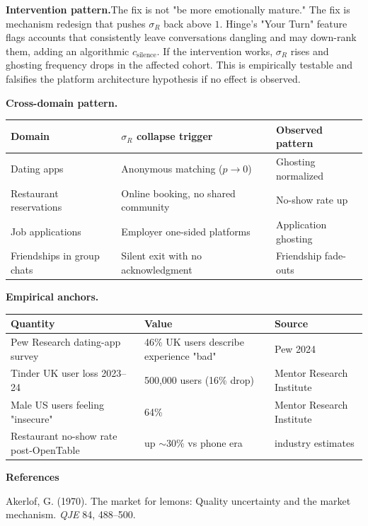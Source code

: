 \documentclass[12pt]{article}
\begin{document}
\bigskip

\medskip\noindent\textbf{Intervention pattern.}\quad The fix is not "be more emotionally mature." The fix is mechanism redesign that pushes $\sigma_R$ back above $1$. Hinge's "Your Turn" feature flags accounts that consistently leave conversations dangling and may down-rank them, adding an algorithmic $c_{\text{silence}}$. If the intervention works, $\sigma_R$ rises and ghosting frequency drops in the affected cohort. This is empirically testable and falsifies the platform architecture hypothesis if no effect is observed.

\bigskip

\medskip\noindent\textbf{Cross-domain pattern.}

\medskip
\begin{tabular}{lll}
\toprule
Domain & $\sigma_R$ collapse trigger & Observed pattern \\
\midrule
Dating apps & Anonymous matching ($p \to 0$) & Ghosting normalized \\
Restaurant reservations & Online booking, no shared community & No-show rate up \\
Job applications & Employer one-sided platforms & Application ghosting \\
Friendships in group chats & Silent exit with no acknowledgment & Friendship fade-outs \\
\bottomrule
\end{tabular}

\newpage

\noindent\textbf{Empirical anchors.}

\medskip
\begin{tabular}{lll}
\toprule
Quantity & Value & Source \\
\midrule
Pew Research dating-app survey & 46\% UK users describe experience "bad" & Pew 2024 \\
Tinder UK user loss 2023--24 & 500{,}000 users (16\% drop) & Mentor Research Institute \\
Male US users feeling "insecure" & 64\% & Mentor Research Institute \\
Restaurant no-show rate post-OpenTable & up $\sim 30\%$ vs phone era & industry estimates \\
\bottomrule
\end{tabular}

\bigskip

\noindent\textbf{References}

\medskip
\noindent[1] Akerlof, G. (1970). The market for lemons: Quality uncertainty and the market mechanism. \textit{QJE} 84, 488--500.
\end{document}
